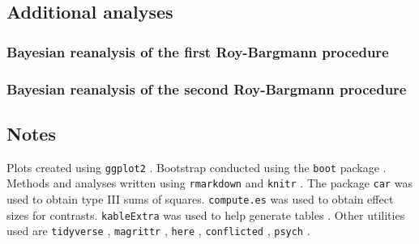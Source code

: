 \documentclass[11pt,]{article}
\begin{document}
\hypertarget{additional-analyses}{%
\subsection{Additional analyses}\label{additional-analyses}}

\hypertarget{bayesian-reanalysis-of-the-first-roy-bargmann-procedure}{%
\subsubsection{Bayesian reanalysis of the first Roy-Bargmann
procedure}\label{bayesian-reanalysis-of-the-first-roy-bargmann-procedure}}

\hypertarget{bayesian-reanalysis-of-the-second-roy-bargmann-procedure}{%
\subsubsection{Bayesian reanalysis of the second Roy-Bargmann
procedure}\label{bayesian-reanalysis-of-the-second-roy-bargmann-procedure}}

\hypertarget{notes}{%
\subsection{Notes}\label{notes}}

Plots created using \texttt{ggplot2}
\citep{wickhamGgplot2ElegantGraphics2016}. Bootstrap conducted using the
\texttt{boot} package \citep{cantyBootBootstrapSPlus2017}. Methods and
analyses written using \texttt{rmarkdown}
\citep{allaireRmarkdownDynamicDocuments2019} and \texttt{knitr}
\citep{xieKnitrGeneralPurposePackage2019}. The package \texttt{car}
\citep{foxCompanionAppliedRegression2011} was used to obtain type III
sums of squares. \texttt{compute.es} \citep{reComputeEsCompute2013} was
used to obtain effect sizes for contrasts. \texttt{kableExtra} was used
to help generate tables \citep{zhuKableExtraConstructComplex2019}. Other
utilities used are \texttt{tidyverse}
\citep{wickhamTidyverseEasilyInstall2017}, \texttt{magrittr}
\citep{bacheMagrittrForwardPipeOperator2014}, \texttt{here}
\citep{mullerHereSimplerWay2017}, \texttt{conflicted}
\citep{wickhamConflictedAlternativeConflict2018}, \texttt{psych}
\citep{revellePsychProceduresPsychological2018}.



\end{document}
